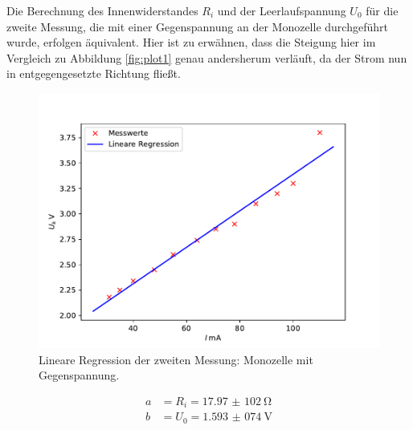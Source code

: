 \noindent Die Berechnung des Innenwiderstandes $R_{i}$ und der Leerlaufspannung $U_{0}$ für
die zweite Messung, die mit einer Gegenspannung an der Monozelle durchgeführt wurde,
erfolgen äquivalent. Hier ist zu erwähnen, dass die Steigung hier im Vergleich
zu Abbildung \ref{fig:plot1} genau andersherum verläuft, da der Strom nun in entgegengesetzte
Richtung fließt. 

\begin{figure}[H]
  \centering
  \includegraphics{plot2.pdf}
  \caption{Lineare Regression der zweiten Messung: Monozelle mit Gegenspannung.}
  \label{fig:plot2}
\end{figure}

\begin{align*}
  a &= R_{i} = \SI{17,97(102)}{\ohm} \\
  b &= U_{0} = \SI{1,593(074)}{\volt}
\end{align*}

